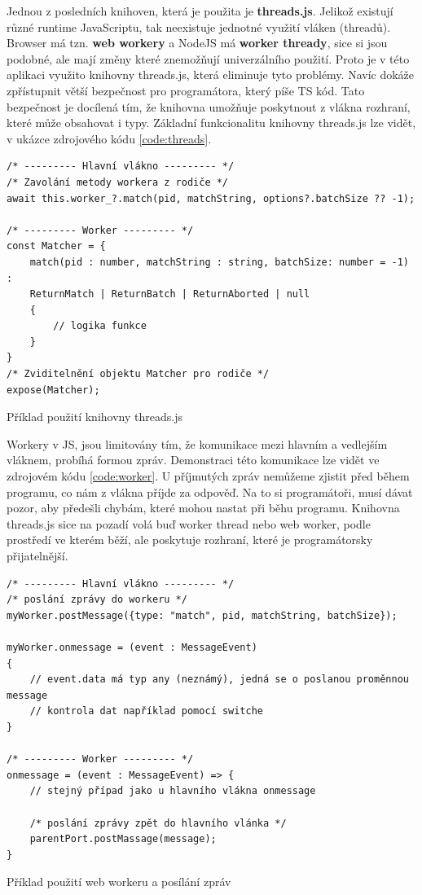 Jednou z posledních knihoven, která je použita je \textbf{threads.js}. 
Jelikož existují různé runtime JavaScriptu, tak neexistuje jednotné využití vláken (threadů).
Browser má tzn. \textbf{web workery} a NodeJS má \textbf{worker thready}, sice si jsou podobné, ale mají změny které znemožňují univerzálního použití.
Proto je v této aplikaci využito knihovny threads.js, která eliminuje tyto problémy.
Navíc dokáže zpřístupnit větší bezpečnost pro programátora, který píše TS kód. 
Tato bezpečnost je docílená tím, že knihovna umožňuje poskytnout z vlákna rozhraní, které může obsahovat i typy.
Základní funkcionalitu knihovny threads.js lze vidět, v ukázce zdrojového kódu \ref{code:threads}.

\begin{code}[!ht]
	\begin{verbatim}
/* --------- Hlavní vlákno --------- */
/* Zavolání metody workera z rodiče */
await this.worker_?.match(pid, matchString, options?.batchSize ?? -1);

/* --------- Worker --------- */
const Matcher = {
	match(pid : number, matchString : string, batchSize: number = -1) : 
	ReturnMatch | ReturnBatch | ReturnAborted | null
	{
		// logika funkce
	}
}
/* Zviditelnění objektu Matcher pro rodiče */
expose(Matcher);
	\end{verbatim}
	\caption{Příklad použití knihovny threads.js}
	\label{code:threads}
\end{code}

Workery v JS, jsou limitovány tím, že komunikace mezi hlavním a vedlejším vláknem, probíhá formou zpráv.
Demonstraci této komunikace lze vidět ve zdrojovém kódu \ref{code:worker}.
U příjmutých zpráv nemůžeme zjistit před během programu, co nám z vlákna příjde za odpověď. 
Na to si programátoři, musí dávat pozor, aby předešli chybám, které mohou nastat při běhu programu.
Knihovna threads.js sice na pozadí volá buď worker thread nebo web worker, podle prostředí ve kterém běží, 
ale poskytuje rozhraní, které je programátorsky přijatelnější.

\begin{code}[!ht]
	\begin{verbatim}
/* --------- Hlavní vlákno --------- */
/* poslání zprávy do workeru */
myWorker.postMessage({type: "match", pid, matchString, batchSize});

myWorker.onmessage = (event : MessageEvent)
{
	// event.data má typ any (neznámý), jedná se o poslanou proměnnou message 
	// kontrola dat například pomocí switche
}

/* --------- Worker --------- */
onmessage = (event : MessageEvent) => {
	// stejný případ jako u hlavního vlákna onmessage

	/* poslání zprávy zpět do hlavního vlánka */
	parentPort.postMassage(message);
}
	\end{verbatim}
	\caption{Příklad použití web workeru a posílání zpráv}
	\label{code:worker}
\end{code}

\endinput